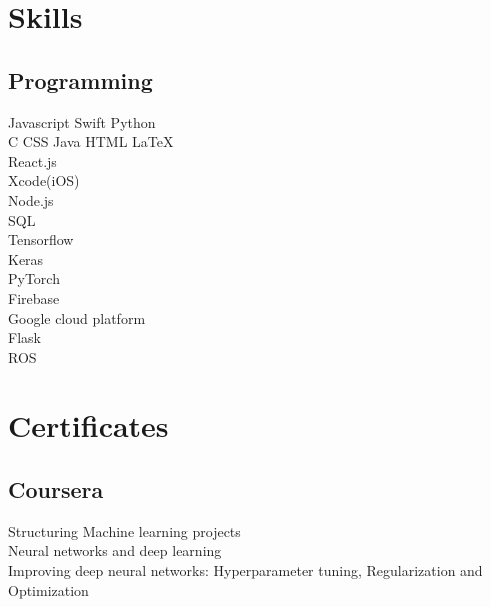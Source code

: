 \documentclass[]{deedy-resume-openfont}
\begin{document}
\begin{minipage}[t]{0.33\textwidth}
\section{Skills}
\subsection{Programming}
Javascript \textbullet{}  Swift \textbullet{} Python \\
C \textbullet{} CSS \textbullet{} Java \textbullet{} HTML \textbullet{} \LaTeX\ \\
\textbullet{} React.js \\
\textbullet{} Xcode(iOS) \\
\textbullet{} Node.js \\
\textbullet{} SQL \\
\textbullet{} Tensorflow \\
\textbullet{} Keras\\
\textbullet{} PyTorch \\
\textbullet{} Firebase \\
\textbullet{} Google cloud platform \\
\textbullet{} Flask\\
\textbullet{} ROS\\
\sectionsep

\section{Certificates}
\subsection{Coursera}
\textbullet{}Structuring Machine learning projects\\ \textbullet{} Neural networks and deep learning \\
\textbullet{} Improving deep neural networks: Hyperparameter tuning, Regularization and Optimization

\sectionsep

%
%

\end{minipage} 
\hfill
\end{document}
